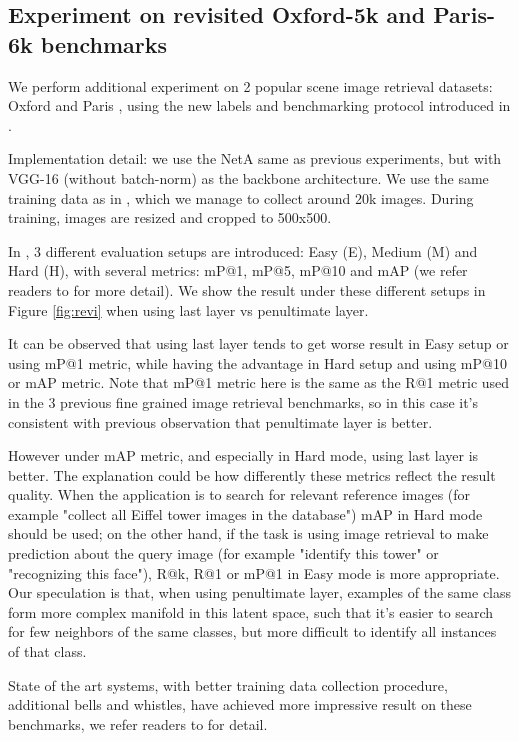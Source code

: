 \documentclass[10pt,twocolumn,letterpaper]{article}
\begin{document}
\subsection{Experiment on revisited Oxford-5k and Paris-6k benchmarks}


We perform additional experiment on 2 popular scene image retrieval datasets: Oxford \cite{Philbin07} and Paris \cite{Philbin08}, using the new labels and benchmarking protocol introduced in \cite{Radenovic-CVPR18}.

Implementation detail: we use the NetA same as previous experiments, but with VGG-16 (without batch-norm) as the backbone architecture. We use the same training data as in \cite{gordo2016deep}, which we manage to collect around 20k images. During training, images are resized and cropped to 500x500.


In \cite{Radenovic-CVPR18}, 3 different evaluation setups are introduced: Easy (E), Medium (M) and Hard (H), with several metrics: mP@1, mP@5, mP@10 and mAP (we refer readers to \cite{Radenovic-CVPR18} for more detail). We show the result under these different setups in Figure \ref{fig:revi} when using last layer vs penultimate layer.

It can be observed that using last layer tends to get worse result in Easy setup or using mP@1 metric, while having the advantage in Hard setup and using mP@10 or mAP metric. Note that mP@1 metric here is the same as the R@1 metric used in the 3 previous fine grained image retrieval benchmarks, so in this case it's consistent with previous observation that penultimate layer is better.

However under mAP metric, and especially in Hard mode, using last layer is better. The explanation could be how differently these metrics reflect the result quality. When the application is to search for relevant reference images (for example "collect all Eiffel tower images in the database") mAP in Hard mode should be used; on the other hand, if the task is using image retrieval to make prediction about the query image (for example "identify this tower" or "recognizing this face"), R@k, R@1 or mP@1 in Easy mode is more appropriate. Our speculation is that, when using penultimate layer, examples of the same class form more complex manifold in this latent space, such that it's easier to search for few neighbors of the same classes, but more difficult to identify all instances of that class.

State of the art systems, with better training data collection procedure, additional bells and whistles, have achieved more impressive result on these benchmarks, we refer readers to \cite{Radenovic-CVPR18} for detail. 
\end{document}
